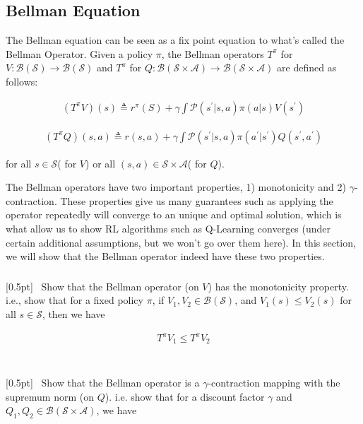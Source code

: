 \subsection{Bellman Equation}
The Bellman equation can be seen as a fix point equation to what's called the Bellman Operator. Given a policy $\pi$, the Bellman operators $T^\pi$ for $V: \mathcal {B(S)}  \to \mathcal {B(S)}$ and $T^\pi$ for $Q: \mathcal {B (S \times A)}  \to \mathcal {B (S \times A)}$ are defined as follows:

\begin{align}
    (T^\pi V)(s) \triangleq r^\pi(S) + \gamma \int \mathcal{P}(s^{\prime} | s,a) \pi(a|s)V(s^{\prime})
\end{align}

\begin{align}
    (T^\pi Q)(s,a) \triangleq r(s,a) + \gamma \int \mathcal{P}(s^{\prime} | s,a) \pi(a^{\prime}|s^{\prime})Q(s^{\prime}, a^{\prime})
\end{align}

\noindent for all $s \in \mathcal {S}$( for $V$) or all $(s,a) \in \mathcal {S} \times \mathcal {A}$( for $Q$).

The Bellman operators have two important properties, 1) monotonicity and 2) $\gamma$-contraction. These properties give us many guarantees such as applying the operator repeatedly will converge to an unique and optimal solution, which is what allow us to show RL algorithms such as Q-Learning converges (under certain additional assumptions, but we won’t go over them here). In this section, we will show that the Bellman operator indeed have these two properties.


\subsubsection{} {\color{blue} [0.5pt]} \ Show that the Bellman operator (on $V$) has the monotonicity property. i.e., show that for a fixed policy $\pi$, if $V_1,V_2 \in \mathcal {B(S)}$, and $V_1(s) \leq V_2(s)$ for all $s \in \mathcal{S}$, then we have

\begin{align}
    T^\pi V_1 \leq T^\pi V_2
\end{align} \\

\subsubsection{} {\color{blue} [0.5pt]} \ Show that the Bellman operator is a $\gamma$-contraction mapping with the supremum norm (on $Q$). i.e. show that for a discount factor $\gamma$ and $Q_1,Q_2 \in \mathcal {B (S \times A)}$, we have

